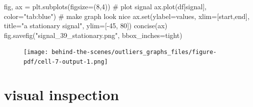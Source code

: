 \documentclass[
  letterpaper,
  DIV=11,
  numbers=noendperiod,
  oneside]{scrreprt}
\newenvironment{Shaded}{\begin{snugshade}}{\end{snugshade}}
\newcommand{\BuiltInTok}[1]{\textcolor[rgb]{0.00,0.23,0.31}{#1}}
\newcommand{\CommentTok}[1]{\textcolor[rgb]{0.37,0.37,0.37}{#1}}
\newcommand{\DecValTok}[1]{\textcolor[rgb]{0.68,0.00,0.00}{#1}}
\newcommand{\NormalTok}[1]{\textcolor[rgb]{0.00,0.23,0.31}{#1}}
\newcommand{\OperatorTok}[1]{\textcolor[rgb]{0.37,0.37,0.37}{#1}}
\newcommand{\StringTok}[1]{\textcolor[rgb]{0.13,0.47,0.30}{#1}}
\begin{document}
\begin{Shaded}
\begin{Highlighting}[]
\NormalTok{fig, ax }\OperatorTok{=}\NormalTok{ plt.subplots(figsize}\OperatorTok{=}\NormalTok{(}\DecValTok{8}\NormalTok{,}\DecValTok{4}\NormalTok{))}
\CommentTok{\# plot signal}
\NormalTok{ax.plot(df[}\StringTok{\textquotesingle{}signal\textquotesingle{}}\NormalTok{], color}\OperatorTok{=}\StringTok{"tab:blue"}\NormalTok{)}
\CommentTok{\# make graph look nice}
\NormalTok{ax.}\BuiltInTok{set}\NormalTok{(ylabel}\OperatorTok{=}\StringTok{\textquotesingle{}values\textquotesingle{}}\NormalTok{,}
\NormalTok{       xlim}\OperatorTok{=}\NormalTok{[start,end],}
\NormalTok{       title}\OperatorTok{=}\StringTok{"a stationary signal"}\NormalTok{,}
\NormalTok{       ylim}\OperatorTok{=}\NormalTok{[}\OperatorTok{{-}}\DecValTok{45}\NormalTok{, }\DecValTok{80}\NormalTok{])}
\NormalTok{concise(ax)}
\NormalTok{fig.savefig(}\StringTok{"signal\_39\_stationary.png"}\NormalTok{, bbox\_inches}\OperatorTok{=}\StringTok{\textquotesingle{}tight\textquotesingle{}}\NormalTok{)}
\end{Highlighting}
\end{Shaded}

\begin{figure}[H]

{\centering \texttt{[image: behind-the-scenes/outliers\_graphs\_files/figure-pdf/cell-7-output-1.png]}

}

\end{figure}

\hypertarget{visual-inspection-1}{%
\section{visual inspection}\label{visual-inspection-1}}
\end{document}
